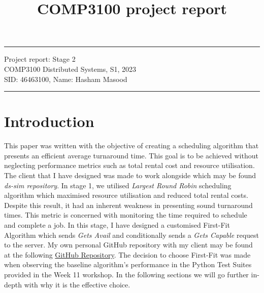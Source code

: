 \documentclass[a4paper]{article} %
\begin{document}

\title{COMP3100 project report} %
\fancyhead[C]{}
\hrule \medskip %
\begin{minipage}{1\textwidth} %
\centering 
\large %
Project report: Stage 2\\ %
COMP3100 Distributed Systems, S1, 2023\\
\normalsize %
SID: 46463100, Name: Hasham Masood
\end{minipage}
\medskip\hrule %
\bigskip

\section{Introduction}
This paper was written with the objective of creating a scheduling algorithm that presents an efficient average turnaround time. This goal is to be achieved without neglecting performance metrics such as total rental cost and resource utilisation. The client that I have designed was made to work alongside \textbf{} which may be found {\emph{ds-sim repository}}\cite{MQGithub}. In stage 1, we utilised \textit{Largest Round Robin} scheduling algorithm which maximised resource utilisation and reduced total rental costs. Despite this result, it had an inherent weakness in presenting sound turnaround times. This metric is concerned with monitoring the time required to schedule and complete a job. In this stage, I have designed a customised First-Fit Algorithm which sends \textit{Gets Avail} and conditionally sends a \textit{Gets Capable} request to the server. My own personal GitHub repository with my client may be found at the following \href{https://www.google.com}{GitHub Repository}\cite{MyGithub}. The decision to choose First-Fit was made when observing the baseline algorithm's performance in the Python Test Suites provided in the Week 11 workshop. In the following sections we will go further in-depth with why it is the effective choice.
\end{document}
